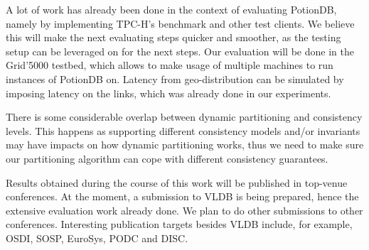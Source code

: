 A lot of work has already been done in the context of evaluating PotionDB, namely by implementing TPC-H's benchmark and other test clients.
We believe this will make the next evaluating steps quicker and smoother, as the testing setup can be leveraged on for the next steps.
Our evaluation will be done in the Grid'5000 testbed, which allows to make usage of multiple machines to run instances of PotionDB on.
Latency from geo-distribution can be simulated by imposing latency on the links, which was already done in our experiments.


There is some considerable overlap between dynamic partitioning and consistency levels.
This happens as supporting different consistency models and/or invariants may have impacts on how dynamic partitioning works, thus we need to make sure our partitioning algorithm can cope with different consistency guarantees.

Results obtained during the course of this work will be published in top-venue conferences.
At the moment, a submission to VLDB is being prepared, hence the extensive evaluation work already done.
We plan to do other submissions to other conferences.
Interesting publication targets besides VLDB include, for example, OSDI, SOSP, EuroSys, PODC and DISC.


